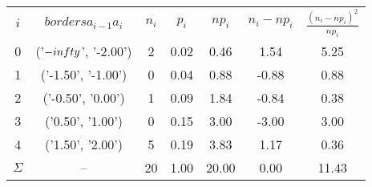 \begin{table}[H]
    \centering
    \begin{tabular}{c|c|c|c|c|c|c}
        $i$ & $borders a_{i-1} a_{i}$ & $n_i$ & $p_i$ & $np_i$ & $n_i - np_i$ & $\frac{(n_i - np_i)^2}{np_i}$ \\
        0 & ('$-\\infty$', '-2.00') & 2 & 0.02 & 0.46 & 1.54 & 5.25 \\
        1 & ('-1.50', '-1.00') & 0 & 0.04 & 0.88 & -0.88 & 0.88 \\
        2 & ('-0.50', '0.00') & 1 & 0.09 & 1.84 & -0.84 & 0.38 \\
        3 & ('0.50', '1.00') & 0 & 0.15 & 3.00 & -3.00 & 3.00 \\
        4 & ('1.50', '2.00') & 5 & 0.19 & 3.83 & 1.17 & 0.36 \\
        $\Sigma$ & -- & 20 & 1.00 & 20.00 & 0.00 & 11.43 
    \end{tabular}
    \caption{}
    \label{}
\end{table}
